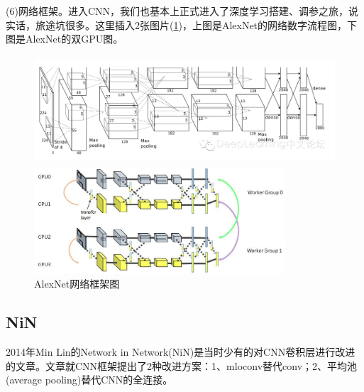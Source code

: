         \par
        (6)网络框架。进入CNN，我们也基本上正式进入了深度学习搭建、调参之旅，说实话，旅途坑很多。这里插入2张图片(\ref{fig:AlexNet网络框架图})，上图是AlexNet的网络数字流程图，下图是AlexNet的双GPU图。
        \begin{figure}[H]
          \centering
          \begin{varwidth}[t]{\textwidth}
            \vspace{0pt}
            \includegraphics[height=4cm]{images/AlexNet_net_digital_flow_chart.jpg}
          \end{varwidth}
          \qquad
          \begin{varwidth}[t]{\textwidth}
            \vspace{0pt}
            \includegraphics[height=4cm]{images/AlexNet_double_GPU.jpg}
          \end{varwidth}
          \caption{AlexNet网络框架图}
          \label{fig:AlexNet网络框架图}
        \end{figure}

    \subsection{NiN}
        \par
        2014年Min Lin的Network in Network(NiN)\cite{2014.MinLin}是当时少有的对CNN卷积层进行改进的文章。文章就CNN框架提出了2种改进方案：1、mloconv替代conv；2、平均池(average pooling)替代CNN的全连接。
